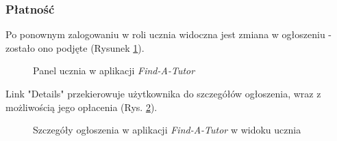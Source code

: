 \documentclass[12pt]{article}
\numberwithin{figure}{section}
\begin{document}
\begin{sloppypar}
\subsubsection{Płatność}
Po ponownym zalogowaniu w roli ucznia widoczna jest zmiana w ogłoszeniu - zostało ono podjęte (Rysunek \ref{fig:student-assigned}).
\begin{figure}[!htbp] 
    \centering
    \caption{Panel ucznia w aplikacji \textit{Find-A-Tutor}}
    \label{fig:student-assigned}
\end{figure}

Link "Details" przekierowuje użytkownika do szczegółów ogłoszenia, wraz z możliwością jego opłacenia (Rys. \ref{fig:details}). 
\begin{figure}[!htbp] 
    \centering
    \caption{Szczegóły ogłoszenia w aplikacji \textit{Find-A-Tutor} w widoku ucznia}
    \label{fig:details}
\end{figure}


\end{sloppypar}
\end{document}
